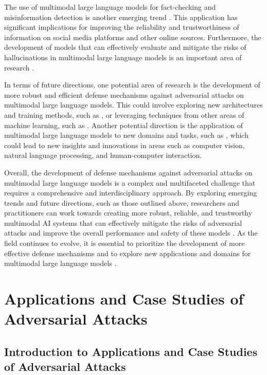 \documentclass[11pt,a4paper]{article}
\begin{document}
The use of multimodal large language models for fact-checking and misinformation detection is another emerging trend \cite{arxiv:2412.05155}. This application has significant implications for improving the reliability and trustworthiness of information on social media platforms and other online sources. Furthermore, the development of models that can effectively evaluate and mitigate the risks of hallucinations in multimodal large language models is an important area of research \cite{arxiv:2410.18325}.

In terms of future directions, one potential area of research is the development of more robust and efficient defense mechanisms against adversarial attacks on multimodal large language models. This could involve exploring new architectures and training methods, such as \cite{arxiv:2408.11795}, or leveraging techniques from other areas of machine learning, such as \cite{arxiv:2511.23375}. Another potential direction is the application of multimodal large language models to new domains and tasks, such as \cite{arxiv:2404.11865}, which could lead to new insights and innovations in areas such as computer vision, natural language processing, and human-computer interaction.

Overall, the development of defense mechanisms against adversarial attacks on multimodal large language models is a complex and multifaceted challenge that requires a comprehensive and interdisciplinary approach. By exploring emerging trends and future directions, such as those outlined above, researchers and practitioners can work towards creating more robust, reliable, and trustworthy multimodal AI systems that can effectively mitigate the risks of adversarial attacks and improve the overall performance and safety of these models \cite{arxiv:2409.18991}. As the field continues to evolve, it is essential to prioritize the development of more effective defense mechanisms and to explore new applications and domains for multimodal large language models \cite{arxiv:2405.07229}.


\section{Applications and Case Studies of Adversarial Attacks}



\subsection{Introduction to Applications and Case Studies of Adversarial Attacks}
\end{document}
